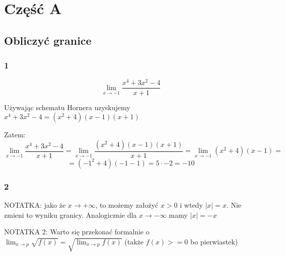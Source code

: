 \documentclass{article}
\begin{document}
\section{Część A}

\subsection{Obliczyć granice}


\subsubsection*{1}

\begin{equation*}
    \lim_{x \to -1} \frac{x^4 + 3x^2 -4}{x + 1}
\end{equation*}

Używając schematu Hornera uzyskujemy \(x^4 + 3x^2 -4 = (x^2 + 4) (x - 1) (x + 1)\)

Zatem:
\begin{equation*}
    \lim_{x \to -1} \frac{x^4 + 3x^2 -4}{x + 1} = \lim_{x \to -1} \frac{(x^2 + 4) (x - 1) (x + 1)}{x + 1} = \lim_{x \to -1} (x^2 + 4)(x - 1) =
\end{equation*}
\begin{equation*}
    = (-1^2 + 4)(-1 - 1) = 5 \cdot -2 = -10  
\end{equation*}

\subsubsection*{2}

\begin{center}
    NOTATKA: jako że \(x \to +\infty\), to możemy założyć \(x>0\) i wtedy \(|x| = x\). Nie zmieni to wyniku granicy.
    Analogicznie dla \(x \to -\infty\) mamy \(|x| = -x\)
\end{center}
\begin{center}
    NOTATKA 2: Warto się przekonać formalnie o \(\lim_{x \to p} \sqrt{f(x)} = \sqrt{\lim_{x \to p} f(x)}\) (także \(f(x) >= 0\) bo pierwiastek)
\end{center}
\end{document}
